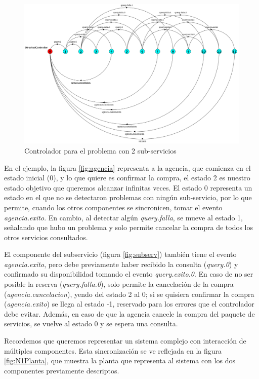 \begin{figure}[htb]
	\includegraphics[width=\linewidth]{figures/ejemploServicios/N2Controlador.png}  
	\caption{Controlador para el problema con 2 sub-servicios}
	\label{fig:N2-control}
\end{figure}

En el ejemplo, la figura \ref{fig:agencia} representa a la agencia, que comienza en el estado inicial (0), y lo que quiere es confirmar la compra, el estado 2 es nuestro estado objetivo que queremos alcanzar infinitas veces. El estado 0 representa un estado en el que no se detectaron problemas con ningún sub-servicio, por lo que permite, cuando los otros componentes se sincronicen, tomar el evento \textit{agencia.exito}. En cambio, al detectar algún \textit{query.falla}, se mueve al estado 1, señalando que hubo un problema y solo permite cancelar la compra de todos los otros servicios consultados.

El componente del subservicio (figura \ref{fig:subserv}) también tiene el evento \textit{agencia.exito}, pero debe previamente haber recibido la consulta (\textit{query.0}) y confirmado su disponibilidad tomando el evento \textit{query.exito.0}. En caso de no ser posible la reserva (\textit{query.falla.0}), solo permite la cancelación de la compra (\textit{agencia.cancelacion}), yendo del estado 2 al 0; si se quisiera confirmar la compra (\textit{agencia.exito}) se llega al estado -1, reservado para los errores que el controlador debe evitar. Además, en caso de que la agencia cancele la compra del paquete de servicios, se vuelve al estado 0 y se espera una consulta.

Recordemos que queremos representar un sistema complejo con interacción de múltiples componentes. Esta sincronización se ve reflejada en la figura \ref{fig:N1Planta}, que muestra la planta que representa al sistema con los dos componentes previamente descriptos. 

